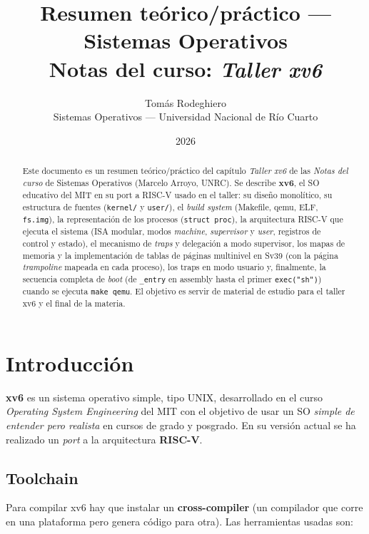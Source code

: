\documentclass[11pt,a4paper]{article}
\title{
    \vspace{-2.5em}
    \textbf{Resumen teórico/práctico --- Sistemas Operativos} \\[0.3em]
    \large Notas del curso: \emph{Taller xv6}
}
\author{
    Tomás Rodeghiero \\
    \small Sistemas Operativos --- Universidad Nacional de Río Cuarto
}
\date{2026}
\begin{document}
\maketitle

\begin{abstract}
\noindent
Este documento es un resumen teórico/práctico del capítulo
\emph{Taller xv6} de las \emph{Notas del curso} de Sistemas Operativos
(Marcelo Arroyo, UNRC). Se describe \textbf{xv6}, el SO educativo del
MIT en su port a RISC-V usado en el taller: su diseño monolítico,
su estructura de fuentes (\texttt{kernel/} y \texttt{user/}), el
\emph{build system} (Makefile, qemu, ELF, \texttt{fs.img}), la
representación de los procesos (\texttt{struct proc}), la arquitectura
RISC-V que ejecuta el sistema (ISA modular, modos \emph{machine},
\emph{supervisor} y \emph{user}, registros de control y estado),
el mecanismo de \emph{traps} y delegación a modo supervisor, los
mapas de memoria y la implementación de tablas de páginas multinivel
en Sv39 (con la página \emph{trampoline} mapeada en cada proceso),
los traps en modo usuario y, finalmente, la secuencia completa de
\emph{boot} (de \texttt{\_entry} en assembly hasta el primer
\texttt{exec("sh")}) cuando se ejecuta \texttt{make qemu}. El objetivo
es servir de material de estudio para el taller xv6 y el final de la
materia.
\end{abstract}

\tableofcontents
\bigskip

\section{Introducción}

\textbf{xv6} es un sistema operativo simple, tipo UNIX, desarrollado en
el curso \emph{Operating System Engineering} del MIT con el objetivo
de usar un SO \emph{simple de entender pero realista} en cursos de
grado y posgrado. En su versión actual se ha realizado un
\emph{port} a la arquitectura \textbf{RISC-V}.

\subsection{Toolchain}

Para compilar xv6 hay que instalar un \textbf{cross-compiler} (un
compilador que corre en una plataforma pero genera código para otra).
Las herramientas usadas son:
\end{document}
